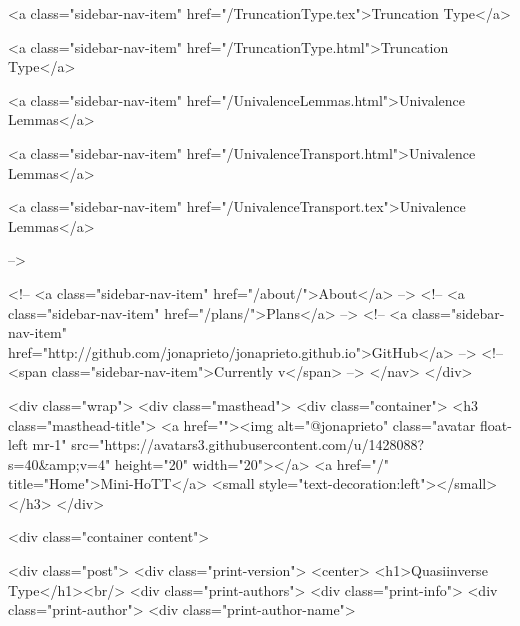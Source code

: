       
    
      
        
          <a class="sidebar-nav-item" href="/TruncationType.tex">Truncation Type</a>
        
      
    
      
        
          <a class="sidebar-nav-item" href="/TruncationType.html">Truncation Type</a>
        
      
    
      
        
          <a class="sidebar-nav-item" href="/UnivalenceLemmas.html">Univalence Lemmas</a>
        
      
    
      
        
          <a class="sidebar-nav-item" href="/UnivalenceTransport.html">Univalence Lemmas</a>
        
      
    
      
        
          <a class="sidebar-nav-item" href="/UnivalenceTransport.tex">Univalence Lemmas</a>
        
      
     -->

    <!-- <a class="sidebar-nav-item" href="/about/">About</a> -->
    <!-- <a class="sidebar-nav-item" href="/plans/">Plans</a> -->
    <!-- <a class="sidebar-nav-item" href="http://github.com/jonaprieto/jonaprieto.github.io">GitHub</a> -->
    <!-- <span class="sidebar-nav-item">Currently v</span> -->
  </nav>
</div>

    <div class="wrap">
      <div class="masthead">
        <div class="container">
          <h3 class="masthead-title">
            <a href=""><img alt="@jonaprieto" class="avatar float-left mr-1" src="https://avatars3.githubusercontent.com/u/1428088?s=40&amp;v=4" height="20" width="20"></a>
            <a href="/" title="Home">Mini-HoTT</a>
            <small style="text-decoration:left"></small>
          </h3>
        </div>
      
      <div class="container content">
        







<div class="post">
  <div class="print-version">
    <center>
      <h1>Quasiinverse Type</h1><br/>
        <div class="print-authors">
          <div class="print-info">
            <div class="print-author">
              <div class="print-author-name">
                
